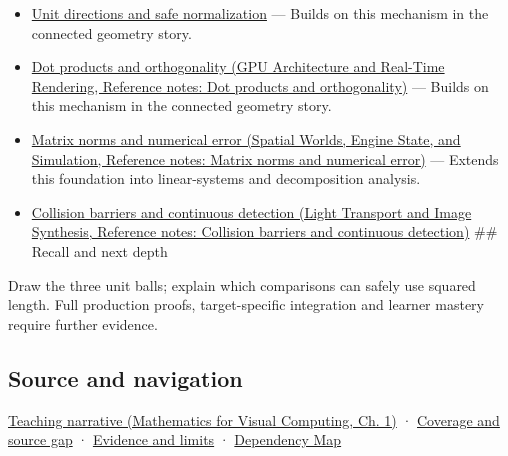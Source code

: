 \hypertarget{appendix-49933872bb51-used-by}{}

\begin{itemize}
\item
  \hyperref[appendix-f744e41b95b4]{Unit directions and safe normalization} --- Builds on this mechanism in the connected geometry story.
\item
  \href{../06-GPU-Architecture-and-Real-Time-Rendering/main.pdf\#nameddest=appendix-8bc4e8fc547c}{Dot products and orthogonality (GPU Architecture and Real-Time Rendering, Reference notes: Dot products and orthogonality)} --- Builds on this mechanism in the connected geometry story.
\item
  \href{../05-Spatial-Worlds-Engine-State-and-Simulation/main.pdf\#nameddest=appendix-f8657bac66e5}{Matrix norms and numerical error (Spatial Worlds, Engine State, and Simulation, Reference notes: Matrix norms and numerical error)} --- Extends this foundation into linear-systems and decomposition analysis.
\item
  \href{../04-Light-Transport-and-Image-Synthesis/main.pdf\#nameddest=appendix-a9ba01fa72a6}{Collision barriers and continuous detection (Light Transport and Image Synthesis, Reference notes: Collision barriers and continuous detection)} \#\# Recall and next depth
\end{itemize}

Draw the three unit balls; explain which comparisons can safely use squared length. Full production proofs, target-specific integration and learner mastery require further evidence.

\subsection{Source and navigation}\label{appendix-49933872bb51-source-and-navigation}

\hypertarget{appendix-49933872bb51-source-and-navigation}{}

\href{../02-Mathematics-for-Visual-Computing/main.pdf\#nameddest=01-foundations-i-ch017-a-ruler-needs-more-than-coordinate-components}{Teaching narrative (Mathematics for Visual Computing, Ch. 1)} · \hyperref[appendix-fd090d982a15-phase-6---parts-501-600]{Coverage and source gap} · \hyperref[appendix-a103e7846d21-phase-6---source-analysis-and-verification]{Evidence and limits} · \hyperref[appendix-4ad47bdd269a]{Dependency Map}
